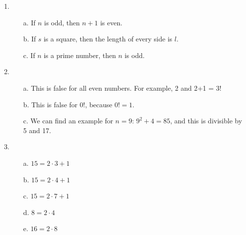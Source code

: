 
\newcommand{\laClass}       {CS 210}
\newcommand{\laSemester}    {Spring 2018}
\newcommand{\laChapter}     {2.1}
\newcommand{\laType}        {Exercise}
\newcommand{\laPoints}      {5}
\newcommand{\laTitle}       {Mathematical Writing}
\newcommand{\laDate}        {}
\setcounter{chapter}{2}
\setcounter{section}{1}
\addtocounter{section}{-1}

\toggletrue{answerkey}






    \begin{enumerate}
        \item
            \begin{itemize}
                \item[a.]   If $n$ is odd, then $n+1$ is even.
                \item[b.]   If $s$ is a square, then the length of every side is $l$.
                \item[c.]   If $n$ is a prime number, then $n$ is odd.
            \end{itemize}

        \item
            \begin{itemize}
                \item[a.]   This is false for all even numbers. For example, 2 and 2+1 = 3!
                \item[b.]   This is false for $0!$, because $0! = 1$.
                \item[c.]   We can find an example for $n=9$: $9^{2} + 4 = 85$, and this is divisible by 5 and 17.
            \end{itemize}

        \item
            \begin{itemize}
                \item[a.] $15 = 2 \cdot 3 + 1$

                \item[b.] $15 = 2 \cdot 4 + 1$

                \item[c.] $15 = 2 \cdot 7 + 1$

                \item[d.] $8 = 2 \cdot 4$

                \item[e.] $16 = 2 \cdot 8$


\end{itemize}
\end{enumerate}
